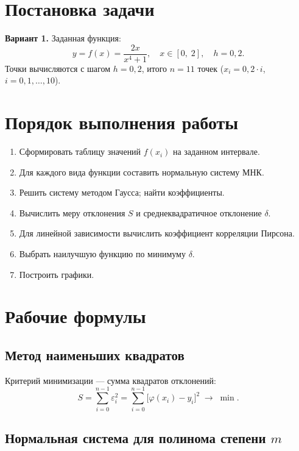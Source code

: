 \documentclass[12pt,a4paper]{article}
\begin{document}
\section{Постановка задачи}

\textbf{Вариант 1.} Заданная функция:
\[
  y = f(x) = \frac{2x}{x^4 + 1}, \quad x \in [0,\; 2], \quad h = 0{,}2.
\]
Точки вычисляются с шагом $h = 0{,}2$, итого $n = 11$ точек
($x_i = 0{,}2\cdot i$, $i = 0, 1, \ldots, 10$).

\section{Порядок выполнения работы}

\begin{enumerate}
  \item Сформировать таблицу значений $f(x_i)$ на заданном интервале.
  \item Для каждого вида функции составить нормальную систему МНК.
  \item Решить систему методом Гаусса; найти коэффициенты.
  \item Вычислить меру отклонения $S$ и среднеквадратичное отклонение $\delta$.
  \item Для линейной зависимости вычислить коэффициент корреляции Пирсона.
  \item Выбрать наилучшую функцию по минимуму $\delta$.
  \item Построить графики.
\end{enumerate}

\section{Рабочие формулы}

\subsection{Метод наименьших квадратов}

Критерий минимизации — сумма квадратов отклонений:
\[
  S = \sum_{i=0}^{n-1} \varepsilon_i^2
    = \sum_{i=0}^{n-1} \bigl[\varphi(x_i) - y_i\bigr]^2 \;\to\; \min.
\]

\subsection{Нормальная система для полинома степени $m$}
\end{document}
